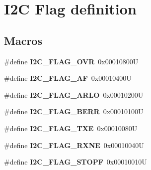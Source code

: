 \hypertarget{group___i2_c___flag__definition}{}\section{I2C Flag definition}
\label{group___i2_c___flag__definition}
\subsection*{Macros}
\begin{DoxyCompactItemize}
\item 
\mbox{\label{group___i2_c___flag__definition_gab579673c8ac920db199aa7f18e547fb3}} 
\#define {\bfseries I2\+C\+\_\+\+F\+L\+A\+G\+\_\+\+O\+VR}~0x00010800U
\item 
\mbox{\label{group___i2_c___flag__definition_ga2f89dbba9b964e6ade1480705e7a97d4}} 
\#define {\bfseries I2\+C\+\_\+\+F\+L\+A\+G\+\_\+\+AF}~0x00010400U
\item 
\mbox{\label{group___i2_c___flag__definition_gae1e67936f4780e42b8bbe04ac9c20a7b}} 
\#define {\bfseries I2\+C\+\_\+\+F\+L\+A\+G\+\_\+\+A\+R\+LO}~0x00010200U
\item 
\mbox{\label{group___i2_c___flag__definition_ga0454176b6ddd5c402abc3ef5953a21ad}} 
\#define {\bfseries I2\+C\+\_\+\+F\+L\+A\+G\+\_\+\+B\+E\+RR}~0x00010100U
\item 
\mbox{\label{group___i2_c___flag__definition_gaeda14a3e9d02ff20a0d001bba9328f3d}} 
\#define {\bfseries I2\+C\+\_\+\+F\+L\+A\+G\+\_\+\+T\+XE}~0x00010080U
\item 
\mbox{\label{group___i2_c___flag__definition_gad53c5b70a186f699f187c7a641ab0dac}} 
\#define {\bfseries I2\+C\+\_\+\+F\+L\+A\+G\+\_\+\+R\+X\+NE}~0x00010040U
\item 
\mbox{\label{group___i2_c___flag__definition_gacc7d993963e199a6ddba391dab8da896}} 
\#define {\bfseries I2\+C\+\_\+\+F\+L\+A\+G\+\_\+\+S\+T\+O\+PF}~0x00010010U
\item 
\mbox{\label{group___i2_c___flag__definition_ga316c78cbf34b74da96d69f702a0d1444}} 

\end{DoxyCompactItemize}
